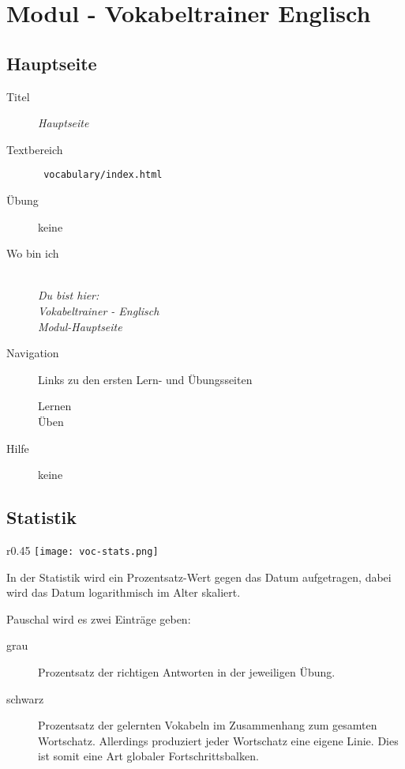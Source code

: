 \chapter{ Modul - Vokabeltrainer Englisch }
\label{has:voc-module}

\section{ Hauptseite }
\label{has:voc-module-mainpage}
\begin{description}
	\item[Titel] \emph{ Hauptseite }
	\item[Textbereich] \texttt{ vocabulary/index.html }
	\item[Übung] keine
	\item[Wo bin ich] \emph{\\Du bist hier:\\Vokabeltrainer - Englisch\\Modul-Hauptseite}
	\item[Navigation] Links zu den ersten Lern- und Übungsseiten
	\begin{description}
		\item[Lernen] 
		\item[Üben] 
	\end{description}
	\item[Hilfe] keine
\end{description}

\section{ Statistik }
\label{has:voc-module-stats}
\begin{wrapfigure}{r}{0.45\textwidth}
	\texttt{[image: voc-stats.png]}
\end{wrapfigure}
In der Statistik wird ein Prozentsatz-Wert gegen das Datum aufgetragen, dabei wird das Datum logarithmisch im Alter skaliert.

Pauschal wird es zwei Einträge geben:
\begin{description}
	\item[grau] Prozentsatz der richtigen Antworten in der jeweiligen Übung.
	\item[schwarz] Prozentsatz der gelernten Vokabeln im Zusammenhang zum gesamten Wortschatz. Allerdings produziert jeder Wortschatz eine eigene Linie. Dies ist somit eine Art globaler Fortschrittsbalken.
\end{description}


